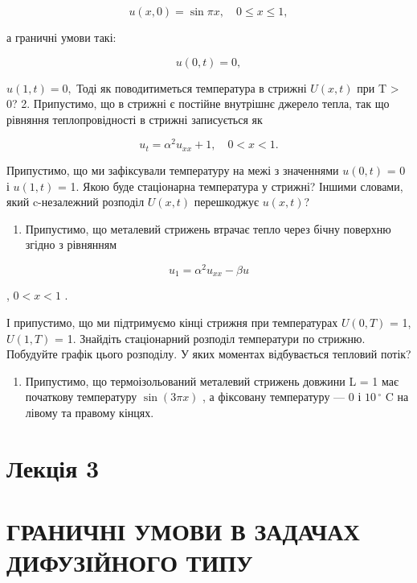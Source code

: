 \documentclass[
  ukrainian,
]{article}
\providecommand{\tightlist}{%
  \setlength{\itemsep}{0pt}\setlength{\parskip}{0pt}}
\begin{document}
\[
u(x, 0) = \sin \pi x, \quad 0 \leqslant x \leqslant 1,
\]

а граничні умови такі:

\[
u(0, t) = 0,
\]

\(u(1, t) = 0,\) Тоді як поводитиметься температура в стрижні
\(U(x, t)\) при T \textgreater{} 0? 2. Припустимо, що в стрижні є
постійне внутрішнє джерело тепла, так що рівняння теплопровідності в
стрижні записується як

\[
u_t = \alpha^2 u_{xx} + 1, \quad 0 < x < 1.
\]

Припустимо, що ми зафіксували температуру на межі з значеннями
\(u(0, t)\) = 0 і \(u(1, t)\) = 1. Якою буде стаціонарна температура у
стрижні? Іншими словами, який c-незалежний розподіл \(U(x, t)\)
перешкоджує \(u(x, t)\)?

\begin{enumerate}
\def\labelenumi{\arabic{enumi}.}
\setcounter{enumi}{2}
\tightlist
\item
  Припустимо, що металевий стрижень втрачає тепло через бічну поверхню
  згідно з рівнянням
\end{enumerate}

\[
u_1 = \alpha^2 u_{xx} - \beta u
\]

, \(0 < x < 1\) .

І припустимо, що ми підтримуємо кінці стрижня при температурах
\(U(0, T)\) = 1, \(U(1, T)\) = 1. Знайдіть стаціонарний розподіл
температури по стрижню. Побудуйте графік цього розподілу. У яких
моментах відбувається тепловий потік?

\begin{enumerate}
\def\labelenumi{\arabic{enumi}.}
\setcounter{enumi}{3}
\tightlist
\item
  Припустимо, що термоізольований металевий стрижень довжини L = 1 має
  початкову температуру \(\sin(3\pi x)\) , а фіксовану температуру --- 0
  і \(10\,^{\circ}\) C на лівому та правому кінцях.
\end{enumerate}

\section{Лекція 3}\label{ux43bux435ux43aux446ux456ux44f-3}

\section{ГРАНИЧНІ УМОВИ В ЗАДАЧАХ ДИФУЗІЙНОГО
ТИПУ}\label{ux433ux440ux430ux43dux438ux447ux43dux456-ux443ux43cux43eux432ux438-ux432-ux437ux430ux434ux430ux447ux430ux445-ux434ux438ux444ux443ux437ux456ux439ux43dux43eux433ux43e-ux442ux438ux43fux443}
\end{document}
